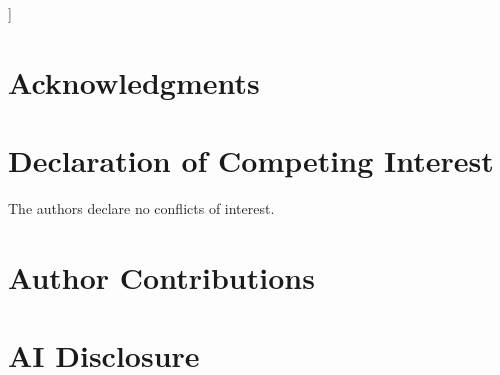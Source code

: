 \documentclass[10pt,a4paper,twocolumn]{article}
\begin{document}
]








\section*{Acknowledgments}

\section*{Declaration of Competing Interest}
The authors declare no conflicts of interest.

\section*{Author Contributions}

\section*{AI Disclosure}



\end{document}
